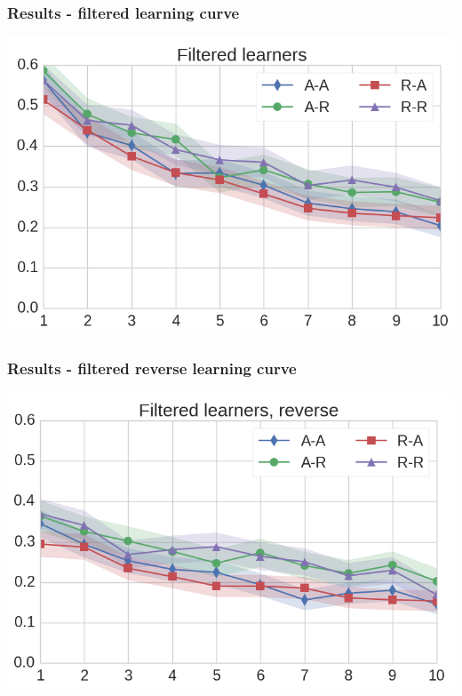 \documentclass[xcolor=svgnames]{beamer}
\begin{document}
\begin{frame}
	\frametitle{Results - filtered learning curve}
   \includegraphics[width=\textwidth]{img/learning_curves_filtered.png}
\end{frame}
\begin{frame}
	\frametitle{Results - filtered reverse learning curve}
   \includegraphics[width=\textwidth]{img/learning_curves_reverse.png}
\end{frame}
\end{document}
